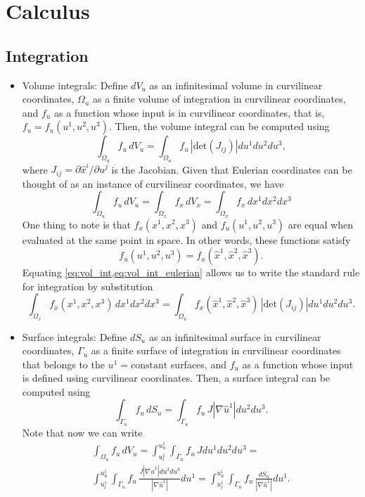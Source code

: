\documentclass[11pt]{article}
\begin{document}
\section{Calculus}
\subsection{Integration}
\begin{itemize}

\item Volume integrals: Define $d V_u$ as an infinitesimal volume in curvilinear coordinates, $\Omega_u$ as a finite volume of integration in curvilinear coordinates, and $f_u$ as a function whose input is in curvilinear coordinates, that is, $f_u = f_u(u^1,u^2,u^3)$. Then, the volume integral can be computed using
\begin{equation}
\label{eq:vol_int}
    \int_{\Omega_u} f_u \, d V_u = \int_{\Omega_u} f_u \, |\text{det}(J_{ij})| du^1 du^2 du^3,
\end{equation}
where $J_{ij} = \partial \hat{x}^i / \partial u^j$ is the Jacobian. Given that Eulerian coordinates can be thought of as an instance of curvilinear coordinates, we have
\begin{equation}
\label{eq:vol_int_eulerian}
    \int_{\Omega_u} f_u \, dV_u =  \int_{\Omega_x} f_x \, dV_x = \int_{\Omega_x} f_x \, dx^1 dx^2 dx^3 
\end{equation}
One thing to note is that $f_x(x^1,x^2,x^3)$ and $f_u(u^1,u^2,u^3)$ are equal when evaluated at the same point in space.
In other words, these functions satisfy
\begin{equation}
    f_u(u^1,u^2,u^3) = f_x(\hat{x}^1, \hat{x}^2, \hat{x}^3).
\end{equation}
Equating \cref{eq:vol_int,eq:vol_int_eulerian} allows us to write the standard rule for integration by substitution
\begin{equation}
    \int_{\Omega_x} f_x(x^1,x^2,x^3) \, dx^1 dx^2 dx^3 = \int_{\Omega_u} f_x(\hat{x}^1, \hat{x}^2, \hat{x}^3) \, |\text{det}(J_{ij})| du^1 du^2 du^3 .
\end{equation}

\item Surface integrals: Define $d S_u$ as an infinitesimal surface in curvilinear coordinates, $\Gamma_u$ as a finite surface of integration in curvilinear coordinates that belongs to the $u^1 = \text{constant}$ surfaces, and $f_u$ as a function whose input is defined using curvilinear coordinates. Then, a surface integral can be computed using 
\begin{equation}
    \int_{\Gamma_u} f_u\, d S_u = \int_{\Gamma_u} f_u \, J | \nabla \hat{u}^1| du^2 du^3.
\end{equation}
Note that now we can write
\begin{multline}
\label{eq:int_from_vol_surf}
    \int_{\Omega_u} f_u \,dV_u = \int_{u^1_l}^{u^1_u} \int_{\Gamma_u} f_u \, J du^1 du^2 du^3 = \\ 
    \int_{u^1_l}^{u^1_u} \int_{\Gamma_u} f_u \, \frac{J | \nabla \hat{u}^1| du^2 du^3}{| \nabla \hat{u}^1 |} du^1 = \int_{u^1_l}^{u^1_u} \int_{\Gamma_u} f_u \, \frac{dS_u}{|\nabla \hat{u}^1|} du^1.
\end{multline}


\end{itemize}
\end{document}
